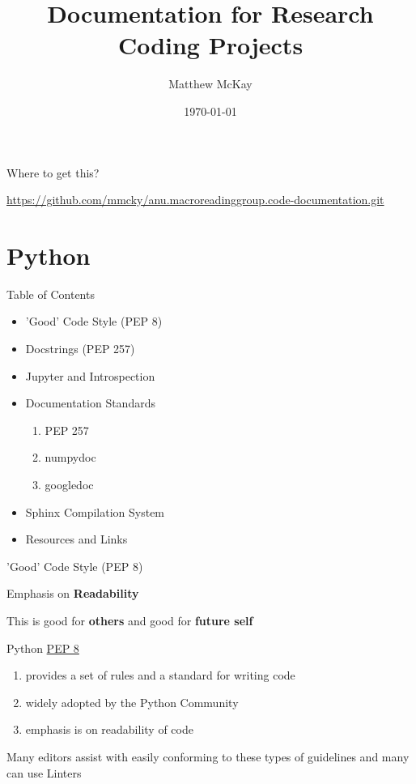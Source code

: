 \documentclass{beamer}
\title{Documentation for Research Coding Projects}
\date{\today}
\author{Matthew McKay}
\institute{QuantEcon - Research School of Economics, ANU, Australia}
\begin{document}
\maketitle

\begin{frame}{Where to get this?}

\url{https://github.com/mmcky/anu.macroreadinggroup.code-documentation.git}

\end{frame}

\section{Python}

\begin{frame}{Table of Contents}
\begin{itemize}
    \item 'Good' Code Style (PEP 8)
    \item Docstrings (PEP 257)
    \item Jupyter and Introspection
    \item Documentation Standards
        \begin{enumerate}
            \item PEP 257
            \item numpydoc
            \item googledoc
        \end{enumerate}
    \item Sphinx Compilation System
    \item Resources and Links
\end{itemize}    
\end{frame}

\begin{frame}{'Good' Code Style (PEP 8)}

Emphasis on \textbf{Readability}

This is good for \textbf{others} and good for \textbf{future self}

Python \href{https://www.python.org/dev/peps/pep-0008/}{PEP 8}

\begin{enumerate}
\item provides a set of rules and a standard for writing code
\item widely adopted by the Python Community
\item emphasis is on readability of code
\end{enumerate}

Many editors assist with easily conforming to these types of guidelines and many can use Linters

\end{frame}
\end{document}
